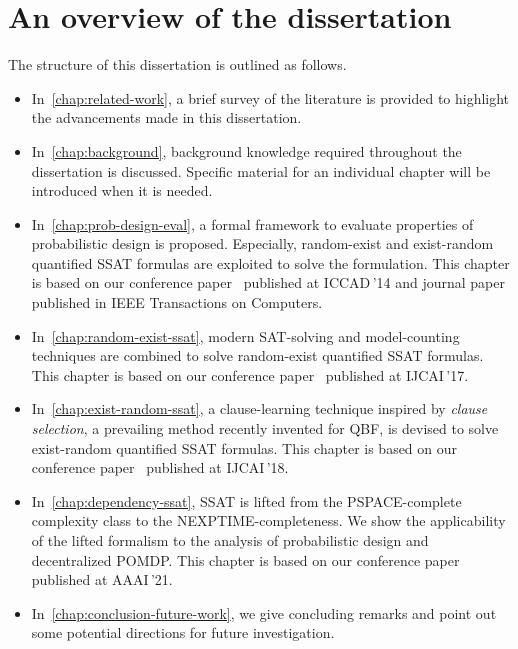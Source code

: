 \section{An overview of the dissertation}
The structure of this dissertation is outlined as follows.
\begin{itemize}
      \item
            In~\cref{chap:related-work}, a brief survey of the literature is provided to highlight the advancements made in this dissertation.
      \item
            In~\cref{chap:background}, background knowledge required throughout the dissertation is discussed.
            Specific material for an individual chapter will be introduced when it is needed.
      \item
            In~\cref{chap:prob-design-eval}, a formal framework to evaluate properties of probabilistic design is proposed.
            Especially, random-exist and exist-random quantified SSAT formulas are exploited to solve the formulation.
            This chapter is based on our conference paper~\cite{LeeICCAD14ProbDesign} published at ICCAD\,'14 and journal paper~\cite{LeeTC18ProbDesign} published in IEEE Transactions on Computers.
      \item
            In~\cref{chap:random-exist-ssat}, modern SAT-solving and model-counting techniques are combined to solve random-exist quantified SSAT formulas.
            This chapter is based on our conference paper~\cite{LeeIJCAI17RESSAT} published at IJCAI\,'17.
      \item
            In~\cref{chap:exist-random-ssat}, a clause-learning technique inspired by \textit{clause selection}, a prevailing method recently invented for QBF, is devised to solve exist-random quantified SSAT formulas.
            This chapter is based on our conference paper~\cite{LeeIJCAI18ERSSAT} published at IJCAI\,'18.
      \item
            In~\cref{chap:dependency-ssat}, SSAT is lifted from the PSPACE-complete complexity class to the NEXPTIME-completeness.
            We show the applicability of the lifted formalism to the analysis of probabilistic design and decentralized POMDP.
            This chapter is based on our conference paper~\cite{LeeAAAI21DSSAT} published at AAAI\,'21.
      \item
            In~\cref{chap:conclusion-future-work}, we give concluding remarks and point out some potential directions for future investigation.
\end{itemize}